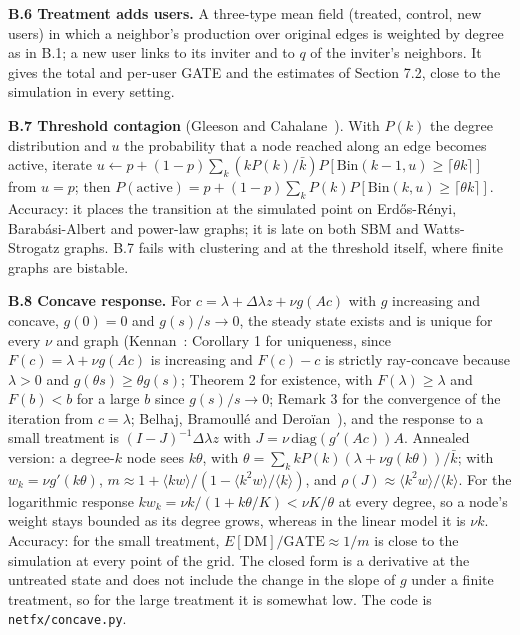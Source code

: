 \documentclass[final,5p,times,twocolumn,number]{elsarticle}
\begin{document}
\textbf{B.6 Treatment adds users.} A three-type mean field (treated, control, new users) in which a neighbor's production over original edges is weighted by degree as in B.1; a new user links to its inviter and to $q$  of the inviter's neighbors. It gives the total and per-user GATE and the estimates of Section 7.2, close to the simulation in every setting.


\textbf{B.7 Threshold contagion} (Gleeson and Cahalane~\cite{r10}). With $P(k)$  the degree distribution and $u$  the probability that a node reached along an edge becomes active, iterate $u \leftarrow p + (1 - p)\sum_k(kP(k)/\bar k)P[\mathrm{Bin}(k - 1, u) \geq \lceil\theta k\rceil]$  from $u = p$; then $P(\text{active}) = p + (1 - p)\sum_k P(k)P[\mathrm{Bin}(k, u) \geq \lceil\theta k\rceil]$. Accuracy: it places the transition at the simulated point on Erdős-Rényi, Barabási-Albert and power-law graphs; it is late on both SBM and Watts-Strogatz graphs. B.7 fails with clustering and at the threshold itself, where finite graphs are bistable.


\textbf{B.8 Concave response.} For $c = \lambda + \Delta\lambda z + \nu g(Ac)$  with $g$  increasing and concave, $g(0) = 0$  and $g(s)/s \to 0$, the steady state exists and is unique for every $\nu$  and graph (Kennan~\cite{r17}: Corollary 1 for uniqueness, since $F(c) = \lambda + \nu g(Ac)$  is increasing and $F(c) - c$  is strictly ray-concave because $\lambda > 0$  and $g(\theta s) \geq \theta g(s)$; Theorem 2 for existence, with $F(\lambda) \geq \lambda$  and $F(b) < b$  for a large $b$  since $g(s)/s \to 0$; Remark 3 for the convergence of the iteration from $c = \lambda$; Belhaj, Bramoullé and Deroïan~\cite{r3}), and the response to a small treatment is $(I - J)^{-1}\Delta\lambda z$  with $J = \nu\,\mathrm{diag}(g'(Ac))A$. Annealed version: a degree-$k$  node sees $k\theta$, with $\theta = \sum_k kP(k)(\lambda + \nu g(k\theta))/\bar k$; with $w_k = \nu g'(k\theta)$, $m \approx 1 + \langle kw\rangle/(1 - \langle k^2w\rangle/\langle k\rangle)$, and $\rho(J) \approx \langle k^2w\rangle/\langle k\rangle$. For the logarithmic response $kw_k = \nu k/(1 + k\theta/K) < \nu K/\theta$  at every degree, so a node's weight stays bounded as its degree grows, whereas in the linear model it is $\nu k$. Accuracy: for the small treatment, $E[\mathrm{DM}]/\mathrm{GATE} \approx 1/m$  is close to the simulation at every point of the grid. The closed form is a derivative at the untreated state and does not include the change in the slope of $g$  under a finite treatment, so for the large treatment it is somewhat low. The code is \texttt{netfx/concave.py}.
\end{document}
